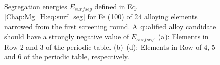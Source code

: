 \newpage
\begingroup
\begin{figure}[!ht]
  \centering
  \label{Chap:Mg_H:fig:6a}
  \label{Chap:Mg_H:fig:6b}
  \\
  \label{Chap:Mg_H:fig:6c}
  \label{Chap:Mg_H:fig:6d}
\caption[Surface segregation energies for Fe (100) of 24 alloying elements]{Segregation energies $E_{surf seg}$ defined in Eq. \ref{Chap:Mg_H:eq:surf_seg} for Fe (100) of 24 alloying elements narrowed from the first screening round. A qualified alloy candidate should have a strongly negative value of $E_{surf seg}$. (a): Elements in Row 2 and 3 of the periodic table. (b)~(d): Elements in Row of 4, 5 and 6 of the periodic table, respectively.}
  \label{Chap:Mg_H:fig6}
\end{figure}
\endgroup

